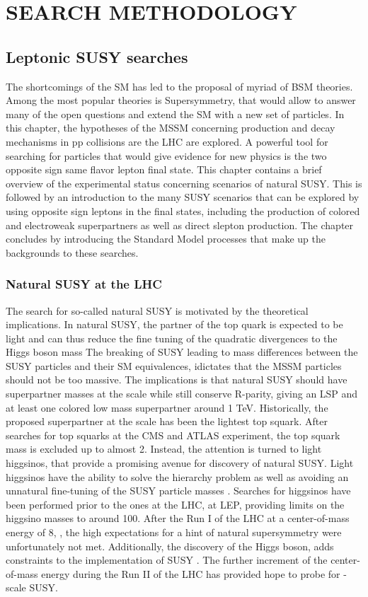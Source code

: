 \part{SEARCH METHODOLOGY}
\chapter{Leptonic SUSY searches} \label{search}
\noindent
\justify
The shortcomings of the SM has led to the proposal of myriad of BSM theories. 
Among the most popular theories is Supersymmetry, that would allow to answer many of the open questions and extend the SM with a new set of particles.
In this chapter, the hypotheses of the MSSM concerning production and decay mechanisms in pp collisions are the LHC are explored. 
A powerful tool for searching for particles that would give evidence for new physics is the two opposite sign same flavor lepton final state. 
This chapter contains a brief overview of the experimental status concerning scenarios of natural SUSY. 
This is followed by an introduction to the many SUSY scenarios that can be explored by using opposite sign leptons in the final states, including the production of colored and electroweak superpartners as well as direct slepton production. 
The chapter concludes by introducing the Standard Model processes that make up the backgrounds to these searches. 
\newpage
\section{Natural SUSY at the LHC}
\noindent\justify
The search for so-called natural SUSY is motivated by the theoretical implications\cite{Dimopoulos:1995mi,Barbieri:2009ev,Papucci:2011wy}.  
In natural SUSY, the partner of the top quark is expected to be light and can thus reduce the fine tuning of the quadratic divergences to the Higgs boson mass
The breaking of SUSY leading to mass differences between the SUSY particles and their SM equivalences, idictates that the MSSM particles should not be too massive. 
The implications is that natural SUSY should have superpartner masses at the \TeV scale while still conserve R-parity, giving an LSP and at least one colored low mass superpartner around 1 TeV. 
Historically, the proposed superpartner at the \TeV scale has been the lightest top squark. 
After searches for top squarks at the CMS and ATLAS experiment, the top squark mass is excluded up to almost 2\TeV. 
Instead, the attention is turned to light higgsinos, that provide a promising avenue for discovery of natural SUSY. 
Light higgsinos have the ability to solve the hierarchy problem as well as avoiding an unnatural fine-tuning of the SUSY particle masses \cite{Han:2014kaa,Giudice:2010wb}. 
Searches for higgsinos have been performed prior to the ones at the LHC, at LEP, providing limits on the higgsino masses to around 100\GeV. 
After the Run I of the LHC at a center-of-mass energy of 8\TeV, \cite{Kraml:2012er,Autermann:2016les}, the high expectations for a hint of natural supersymmetry were unfortunately not met. 
Additionally, the discovery of the Higgs boson, adds constraints to the implementation of SUSY \cite{Arbey:2011ab}. 
The further increment of the center-of-mass energy during the Run II of the LHC has provided hope to probe for \TeV-scale SUSY.
